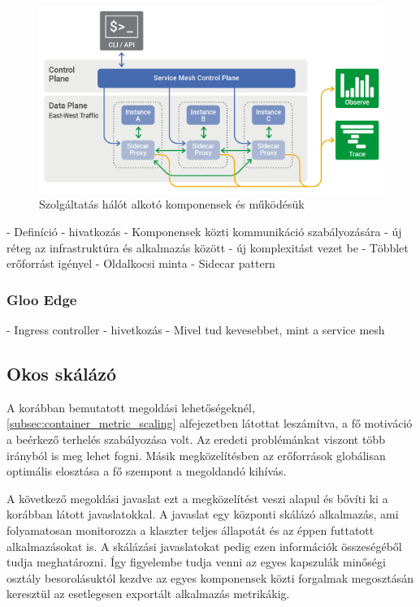 \begin{figure}[!ht]
\centering
\includegraphics[width=150mm, keepaspectratio]{figures/service-mesh-generic-topology.png}
\caption{Szolgáltatás hálót alkotó komponensek és működésük\citep{serviceMeshTopology}}
\label{fig:serviceMesh-topology}
\end{figure}



- Definíció - hivatkozás
- Komponensek közti kommunikáció szabályozására 
- új réteg az infrastruktúra és alkalmazás között
- új komplexitást vezet be
- Többlet erőforrást igényel
- Oldalkocsi minta - Sidecar pattern

\subsubsection{Gloo Edge}
- Ingress controller - hivetkozás
- Mivel tud kevesebbet, mint a service mesh

\subsection{Okos skálázó}

A korábban bemutatott megoldási lehetőségeknél, \ref{subsec:container_metric_scaling} alfejezetben látottat leszámítva, a fő motiváció a beérkező terhelés szabályozása volt.
Az eredeti problémánkat viszont több irányból is meg lehet fogni.
Másik megközelítésben az erőforrások globálisan optimális elosztása a fő szempont a megoldandó kihívás.

A következő megoldási javaslat ezt a megközelítést veszi alapul és bővíti ki a korábban látott javaslatokkal.
A javaslat egy központi skálázó alkalmazás, ami folyamatosan monitorozza a klaszter teljes állapotát és az éppen futtatott alkalmazásokat is.
A skálázási javaslatokat pedig ezen információk összeségéből tudja meghatározni.
Így figyelembe tudja venni az egyes kapszulák minőségi osztály besorolásuktól kezdve az egyes komponensek közti forgalmak megosztásán keresztül az esetlegesen exportált alkalmazás metrikákig.

